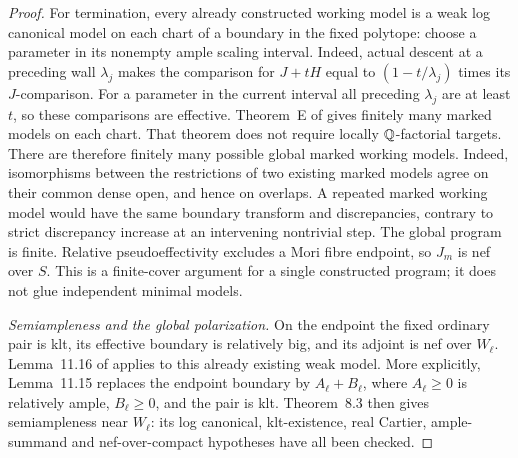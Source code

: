 \begin{proof}
For termination, every already constructed working model is a weak
log canonical model on each chart of a boundary in the fixed
polytope: choose a parameter in its nonempty ample scaling interval.
Indeed, actual descent at a preceding wall \(\lambda_j\) makes
the comparison for \(J+tH\) equal to
\((1-t/\lambda_j)\) times its \(J\)-comparison. For a parameter
in the current interval all preceding \(\lambda_j\) are at least
\(t\), so these comparisons are effective.
Theorem~E of \cite{FujinoAnalyticBCHM} gives finitely many marked
models on each chart. That theorem does not require locally
\(\mathbb Q\)-factorial targets. There are therefore finitely many possible
global marked working models. Indeed, isomorphisms between the
restrictions of two existing marked models agree on their common
dense open, and hence on overlaps. A repeated marked working model
would have the same boundary transform and discrepancies, contrary
to strict discrepancy increase at an intervening nontrivial step.
The global program is finite. Relative pseudoeffectivity excludes
a Mori fibre endpoint, so \(J_m\) is nef over \(S\).
This is a finite-cover argument for a single constructed program;
it does not glue independent minimal models.

\smallskip\noindent
\emph{Semiampleness and the global polarization.}
On the endpoint the fixed ordinary pair is klt, its effective
boundary is relatively big, and its adjoint is nef over
\(W_\ell\). Lemma~11.16 of \cite{FujinoAnalyticBCHM} applies to
this already existing weak model. More explicitly, Lemma~11.15
replaces the endpoint boundary by \(A_\ell+B_\ell\), where
\(A_\ell\geq0\) is relatively ample, \(B_\ell\geq0\), and the
pair is klt. Theorem~8.3 then gives semiampleness near \(W_\ell\):
its log canonical, klt-existence, real Cartier, ample-summand and
nef-over-compact hypotheses have all been checked.


\end{proof}
